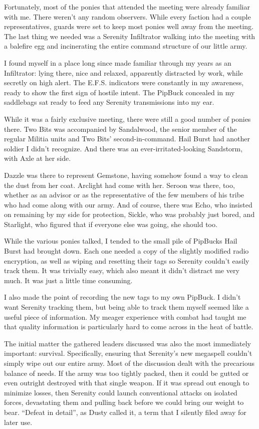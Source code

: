 Fortunately, most of the ponies that attended the meeting were already familiar with me. There weren’t any random observers. While every faction had a couple representatives, guards were set to keep most ponies well away from the meeting. The last thing we needed was a Serenity Infiltrator walking into the meeting with a balefire egg and incinerating the entire command structure of our little army.

I found myself in a place long since made familiar through my years as an Infiltrator: lying there, nice and relaxed, apparently distracted by work, while secretly on high alert. The E.F.S. indicators were constantly in my awareness, ready to show the first sign of hostile intent. The PipBuck concealed in my saddlebags sat ready to feed any Serenity transmissions into my ear.

While it was a fairly exclusive meeting, there were still a good number of ponies there. Two Bits was accompanied by Sandalwood, the senior member of the regular Militia units and Two Bits’ second-in-command. Hail Burst had another soldier I didn’t recognize. And there was an ever-irritated-looking Sandstorm, with Axle at her side.

Dazzle was there to represent Gemstone, having somehow found a way to clean the dust from her coat. Arclight had come with her. Seroon was there, too, whether as an advisor or as the representative of the few members of his tribe who had come along with our army. And of course, there was Echo, who insisted on remaining by my side for protection, Sickle, who was probably just bored, and Starlight, who figured that if everyone else was going, she should too.

While the various ponies talked, I tended to the small pile of PipBucks Hail Burst had brought down. Each one needed a copy of the slightly modified radio encryption, as well as wiping and resetting their tags so Serenity couldn’t easily track them. It was trivially easy, which also meant it didn’t distract me very much. It was just a little time consuming.

I also made the point of recording the new tags to my own PipBuck. I didn’t want Serenity tracking them, but being able to track them myself seemed like a useful piece of information. My meager experience with combat had taught me that quality information is particularly hard to come across in the heat of battle.

The initial matter the gathered leaders discussed was also the most immediately important: survival. Specifically, ensuring that Serenity’s new megaspell couldn’t simply wipe out our entire army. Most of the discussion dealt with the precarious balance of needs. If the army was too tightly packed, then it could be gutted or even outright destroyed with that single weapon. If it was spread out enough to minimize losses, then Serenity could launch conventional attacks on isolated forces, devastating them and pulling back before we could bring our weight to bear. “Defeat in detail”, as Dusty called it, a term that I silently filed away for later use.

